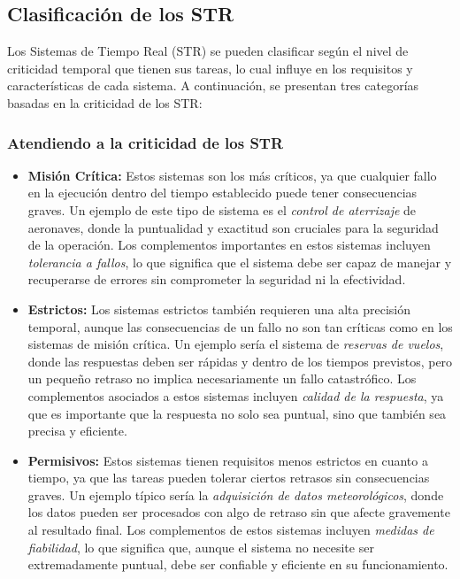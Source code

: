 \documentclass[a4paper,12pt]{article}
\begin{document}
\subsection{Clasificación de los STR}

Los Sistemas de Tiempo Real (STR) se pueden clasificar según el nivel de criticidad temporal que tienen sus tareas, lo cual influye en los requisitos y características de cada sistema. A continuación, se presentan tres categorías basadas en la criticidad de los STR:

\subsubsection{Atendiendo a la criticidad de los STR}

\begin{itemize}
    \item \textbf{Misión Crítica:} Estos sistemas son los más críticos, ya que cualquier fallo en la ejecución dentro del tiempo establecido puede tener consecuencias graves. Un ejemplo de este tipo de sistema es el \textit{control de aterrizaje} de aeronaves, donde la puntualidad y exactitud son cruciales para la seguridad de la operación. Los complementos importantes en estos sistemas incluyen \textit{tolerancia a fallos}, lo que significa que el sistema debe ser capaz de manejar y recuperarse de errores sin comprometer la seguridad ni la efectividad.
    
    \item \textbf{Estrictos:} Los sistemas estrictos también requieren una alta precisión temporal, aunque las consecuencias de un fallo no son tan críticas como en los sistemas de misión crítica. Un ejemplo sería el sistema de \textit{reservas de vuelos}, donde las respuestas deben ser rápidas y dentro de los tiempos previstos, pero un pequeño retraso no implica necesariamente un fallo catastrófico. Los complementos asociados a estos sistemas incluyen \textit{calidad de la respuesta}, ya que es importante que la respuesta no solo sea puntual, sino que también sea precisa y eficiente.
    
    \item \textbf{Permisivos:} Estos sistemas tienen requisitos menos estrictos en cuanto a tiempo, ya que las tareas pueden tolerar ciertos retrasos sin consecuencias graves. Un ejemplo típico sería la \textit{adquisición de datos meteorológicos}, donde los datos pueden ser procesados con algo de retraso sin que afecte gravemente al resultado final. Los complementos de estos sistemas incluyen \textit{medidas de fiabilidad}, lo que significa que, aunque el sistema no necesite ser extremadamente puntual, debe ser confiable y eficiente en su funcionamiento.
\end{itemize}
\end{document}

